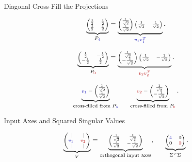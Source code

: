 \documentclass[10pt]{beamer}
\theoremstyle{definition}
\newcommand{\rd}[1]{{\color{red!70!black}#1}}
\newcommand{\bl}[1]{{\color{blue!70!black}#1}}
\begin{document}
\begin{frame}[shrink=10]{Diagonal Cross-Fill the Projections}

\[
\scriptsize
\underbrace{
\begin{pmatrix}
\frac12&\frac12\\
\frac12&\frac12
\end{pmatrix}}_{P_{\bl{4}}}
=
\underbrace{
\begin{pmatrix}
\frac1{\sqrt2}\\[0.15em]
\frac1{\sqrt2}
\end{pmatrix}
\begin{pmatrix}
\frac1{\sqrt2}&\frac1{\sqrt2}
\end{pmatrix}}_{\bl{v_1v_1^T}}.
\]

\vfill

\[
\scriptsize
\underbrace{
\begin{pmatrix}
\frac12&-\frac12\\
-\frac12&\frac12
\end{pmatrix}}_{P_{\rd{0}}}
=
\underbrace{
\begin{pmatrix}
\frac1{\sqrt2}\\[0.15em]
-\frac1{\sqrt2}
\end{pmatrix}
\begin{pmatrix}
\frac1{\sqrt2}&-\frac1{\sqrt2}
\end{pmatrix}}_{\rd{v_2v_2^T}}.
\]

\vfill

\[
\scriptsize
\underbrace{\bl{v_1}=
\begin{pmatrix}
\frac1{\sqrt2}\\[0.15em]
\frac1{\sqrt2}
\end{pmatrix}}_{\text{cross-filled from }P_{\bl{4}}}
\qquad
\underbrace{\rd{v_2}=
\begin{pmatrix}
\frac1{\sqrt2}\\[0.15em]
-\frac1{\sqrt2}
\end{pmatrix}}_{\text{cross-filled from }P_{\rd{0}}}.
\]

\end{frame}


\begin{frame}[shrink=10]{Input Axes and Squared Singular Values}

\[
\scriptsize
\underbrace{
\begin{pmatrix}
|&|\\
\bl{v_1}&\rd{v_2}\\
|&|
\end{pmatrix}}_{V}
=
\underbrace{
\begin{pmatrix}
\frac1{\sqrt2}&\frac1{\sqrt2}\\[0.15em]
\frac1{\sqrt2}&-\frac1{\sqrt2}
\end{pmatrix}}_{\text{orthogonal input axes}},
\qquad
\underbrace{
\begin{pmatrix}
\bl{4}&0\\
0&\rd{0}
\end{pmatrix}}_{\Sigma^T\Sigma}.
\]

\end{frame}
\end{document}
